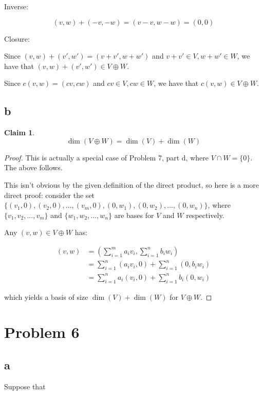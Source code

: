 \documentclass[12pt,letterpaper]{article}
\theoremstyle{definition}
\newtheorem*{claim}{Claim}
\begin{document}
Inverse:

\[
  (v, w) + (-v, -w) = (v - v, w - w) = (0, 0)
\]

Closure:

Since $(v, w) + (v', w') = (v + v', w + w')$ and $v + v' \in V, w + w' \in W$,
we have that $(v, w) + (v', w') \in V \oplus W$.

Since $c(v, w) = (cv, cw)$ and $cv \in V, cw \in W$, we have that $c(v, w) \in V
\oplus W$.

\subsection*{b}

\begin{claim}
  \[
    \dim(V \oplus W) = \dim(V) + \dim(W)
  \]
\end{claim}

\begin{proof}
  This is actually a special case of Problem 7, part d, where $V \cap W = \{0\}$. The
  above follows.

  This isn't obvious by the given definition of the direct product, so here is a
  more direct proof: consider the set $\{(v_1, 0), (v_2, 0), ..., (v_m, 0),
  (0, w_1), (0, w_2), ..., (0, w_n)\}$, where $\{v_1, v_2, ..., v_m\}$ and
  $\{w_1, w_2, ..., w_n\}$ are bases for $V$ and $W$ respectively.

  Any $(v, w) \in V \oplus W$ has:

  \begin{align*}
    (v, w) &= (\sum_{i=1}^ma_iv_i, \sum_{i=1}^nb_iw_i) \\
           &= \sum_{i=1}^n(a_iv_i, 0) + \sum_{i=1}^n(0, b_iw_i) \\
           &= \sum_{i=1}^na_i(v_i, 0) + \sum_{i=1}^nb_i(0, w_i) 
  \end{align*}

  which yields a basis of size $\dim(V) + \dim(W)$ for $V \oplus W$.
\end{proof}

\section*{Problem 6}

\subsection*{a}

Suppose that
\end{document}
